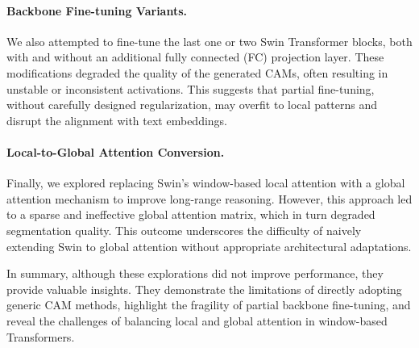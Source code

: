   \paragraph{Backbone Fine-tuning Variants.}
  We also attempted to fine-tune the last one or two Swin Transformer blocks, both with and without an additional fully connected (FC) projection layer. These modifications degraded the quality of the generated CAMs, often resulting in unstable or inconsistent activations. This suggests that partial fine-tuning, without carefully designed regularization, may overfit to local patterns and disrupt the alignment with text embeddings.  
  
  \paragraph{Local-to-Global Attention Conversion.}
  Finally, we explored replacing Swin's window-based local attention with a global attention mechanism to improve long-range reasoning. However, this approach led to a sparse and ineffective global attention matrix, which in turn degraded segmentation quality. This outcome underscores the difficulty of naively extending Swin to global attention without appropriate architectural adaptations.  
  
  In summary, although these explorations did not improve performance, they provide valuable insights. They demonstrate the limitations of directly adopting generic CAM methods, highlight the fragility of partial backbone fine-tuning, and reveal the challenges of balancing local and global attention in window-based Transformers.
